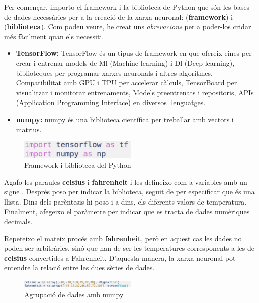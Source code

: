 Per començar, importo el framework i la biblioteca de Python que són les bases de dades necessàries per a la creació de la xarxa neuronal:  (\textbf{framework}) i  (\textbf{biblioteca}). Com podeu veure, he creat uns \textit{abrevacions} per a poder-los cridar més fàcilment quan els necessiti.

\begin{itemize}
 \item \textbf{TensorFlow: } TensorFlow és un tipus de framework en que ofereix eines per crear i entrenar models de Ml (Machine learning) i Dl (Deep learning), biblioteques per programar xarxes neuronals i altres algoritmes, Compatibilitat amb GPU i TPU per accelerar càlculs, TensorBoard per visualitzar i monitorar entrenaments, Models preentrenats i repositoris, APIs (Application Programming Interface) en diversos llenguatges.
 \item \textbf{numpy: } numpy és una biblioteca científica per treballar amb vectors i matrius.
\end{itemize}
\begin{figure}[H]
    \centering
    \includegraphics[width=0.5\textwidth]{./figures/1.png}
    \caption{Framework i biblioteca del Python}
\end{figure}


    Agafo les paraules \textbf{celsius} i \textbf{fahrenheit} i les defineixo com a variables amb un signe \boxed{=}. Després poso  per indicar la biblioteca, seguit de  per especificar que és una llista. Dins dels parèntesis hi poso \boxed{[ ]} i a dins, els diferents valors de temperatura. Finalment, afegeixo el paràmetre  per indicar que es tracta de dades numèriques decimals.

    Repeteixo el mateix procés amb \textbf{fahrenheit}, però en aquest cas les dades no poden ser arbitràries, sinó que han de ser les temperatures corresponents a les de \textbf{celsius} convertides a Fahrenheit. D’aquesta manera, la xarxa neuronal pot entendre la relació entre les dues sèries de dades.


\begin{figure}[H]
    \centering
    \includegraphics[width=0.5\textwidth]{./figures/2.png}
    \caption{Agrupació de dades amb numpy}
\end{figure}

